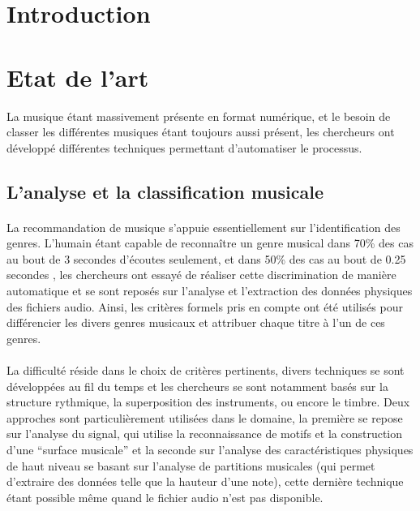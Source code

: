 \documentclass[soumission]{ir}
\begin{document}
\section{Introduction}

\section{Etat de l'art}
La musique étant massivement présente en format numérique, et le besoin de classer les différentes musiques
 étant toujours aussi présent, les chercheurs ont développé différentes techniques permettant d’automatiser 
 le processus.

\subsection{L’analyse et la classification musicale}
\paragraph{}
La recommandation de musique s’appuie essentiellement sur l’identification des genres. L’humain étant capable 
de reconnaître un genre musical dans 70\% des cas au bout de 3 secondes d’écoutes seulement, et dans 50\% 
des cas au bout de 0.25 secondes \cite{TechniqueSimilarites}, les chercheurs ont essayé de réaliser cette 
discrimination de manière automatique et se sont reposés sur l’analyse et l’extraction des données physiques 
des fichiers audio. Ainsi, les critères formels pris en compte ont été utilisés pour différencier les divers 
genres musicaux et attribuer chaque titre à l’un de ces genres.
\paragraph{}
La difficulté réside dans le choix de critères pertinents, divers techniques se sont développées au fil du 
temps et les chercheurs se sont notamment basés sur la structure rythmique, la superposition des instruments, 
ou encore le timbre. Deux approches sont particulièrement utilisées dans le domaine, la première se repose 
sur l’analyse du signal, qui utilise la reconnaissance de motifs et la construction d’une “surface musicale” 
\cite{TechniqueSimilarites} et la seconde sur l'analyse des caractéristiques physiques de haut niveau se 
basant sur l’analyse de partitions musicales (qui permet d’extraire des données telle que la hauteur d’une 
note), cette dernière technique étant possible même quand le fichier audio n’est pas disponible.
\end{document}
